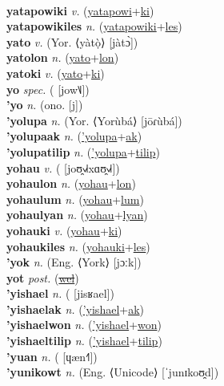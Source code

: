  \label{yatapowinules} \\
\textbf{yatapowiki} \textit{v.} (\hyperref[yatapowi]{yatapowi}+\hyperref[ki]{ki})
 \label{yatapowiki} \\
\textbf{yatapowikiles} \textit{n.} (\hyperref[yatapowiki]{yatapowiki}+\hyperref[les]{les})
 \label{yatapowikiles} \\
\textbf{yato} \textit{v.} (Yor. ⟨yàtọ̀⟩ [jàtɔ̀])
 \label{yato} \\
\textbf{yatolon} \textit{n.} (\hyperref[yato]{yato}+\hyperref[lon]{lon})
 \label{yatolon} \\
\textbf{yatoki} \textit{v.} (\hyperref[yato]{yato}+\hyperref[ki]{ki})
 \label{yatoki} \\
\textbf{yo} \textit{spec.} ( [jow˥˩])
 \label{yo} \\
\textbf{'yo} \textit{n.} (ono. [j])
 \label{'yo} \\
\textbf{'yolupa} \textit{n.} (Yor. ⟨Yorùbá⟩ [jōɾùbá])
 \label{'yolupa} \\
\textbf{'yolupaak} \textit{n.} (\hyperref['yolupa]{'yolupa}+\hyperref[ak]{ak})
 \label{'yolupaak} \\
\textbf{'yolupatilip} \textit{n.} (\hyperref['yolupa]{'yolupa}+\hyperref[tilip]{tilip})
 \label{'yolupatilip} \\
\textbf{yohau} \textit{v.} ( [joʊ̯˧˩˧xɑʊ̯˧˩˧])
 \label{yohau} \\
\textbf{yohaulon} \textit{n.} (\hyperref[yohau]{yohau}+\hyperref[lon]{lon})
 \label{yohaulon} \\
\textbf{yohaulum} \textit{n.} (\hyperref[yohau]{yohau}+\hyperref[lum]{lum})
 \label{yohaulum} \\
\textbf{yohaulyan} \textit{n.} (\hyperref[yohau]{yohau}+\hyperref[lyan]{lyan})
 \label{yohaulyan} \\
\textbf{yohauki} \textit{v.} (\hyperref[yohau]{yohau}+\hyperref[ki]{ki})
 \label{yohauki} \\
\textbf{yohaukiles} \textit{n.} (\hyperref[yohauki]{yohauki}+\hyperref[les]{les})
 \label{yohaukiles} \\
\textbf{'yok} \textit{n.} (Eng. ⟨York⟩ [jɔːk])
 \label{'yok} \\
\textbf{yot} \textit{post.} (\hyperref[wel]{\sout{wel}})
 \label{yot} \\
\textbf{'yishael} \textit{n.} ( [jisʁael])
 \label{'yishael} \\
\textbf{'yishaelak} \textit{n.} (\hyperref['yishael]{'yishael}+\hyperref[ak]{ak})
 \label{'yishaelak} \\
\textbf{'yishaelwon} \textit{n.} (\hyperref['yishael]{'yishael}+\hyperref[won]{won})
 \label{'yishaelwon} \\
\textbf{'yishaeltilip} \textit{n.} (\hyperref['yishael]{'yishael}+\hyperref[tilip]{tilip})
 \label{'yishaeltilip} \\
\textbf{'yuan} \textit{n.} ( [ɥæn˧˥])
 \label{'yuan} \\
\textbf{'yunikowt} \textit{n.} (Eng. ⟨Unicode⟩ [ˈjunɪkoʊ̯d])
 \label{'yunikowt} 

